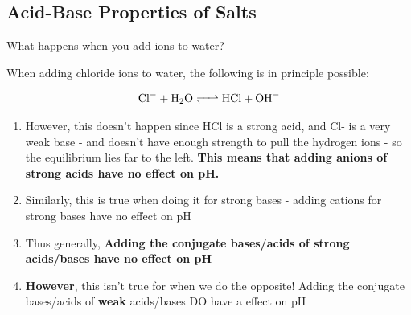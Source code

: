 \documentclass[../CHEM152Notes.tex]{subfiles}
\begin{document}
\subsection*{Acid-Base Properties of Salts}
What happens when you add ions to water? 
\newline
\begin{exmp}
    When adding chloride ions to water, the following is in principle possible:
\end{exmp}
\begin{equation*}
    \begin{aligned}
        \ce{Cl- + H2O <=> HCl + OH-}
    \end{aligned}
\end{equation*}
\begin{enumerate}
    \item However, this doesn't happen since HCl is a strong acid, and Cl- is a very weak base - and doesn't have enough strength to pull the hydrogen ions - so the equilibrium lies far to the left. \textbf{This means that adding anions of strong acids have no effect on pH.} 
    \item Similarly, this is true when doing it for strong bases - adding cations for strong bases have no effect on pH
    \item Thus generally, \textbf{Adding the conjugate bases/acids of strong acids/bases have no effect on pH}
    \item \textbf{However}, this isn't true for when we do the opposite! Adding the conjugate bases/acids of \textbf{weak} acids/bases DO have a effect on pH 
\end{enumerate} 
\end{document}
